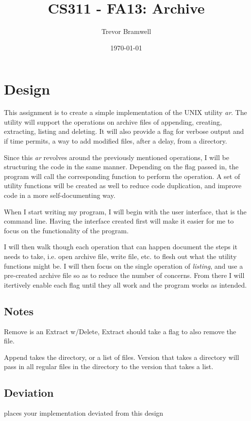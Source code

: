 \documentclass[letterpaper,10pt]{article}
\title{CS311 - FA13: Archive}
\date{\today}
\author{Trevor Bramwell}
\begin{document}
\maketitle

\section{Design}
    This assignment is to create a simple implementation of the UNIX
    utility \emph{ar}. The utility will support the operations on archive files
    of appending, creating, extracting, listing and deleting. It will
    also provide a flag for verbose output and if time permits, a way to
    add modified files, after a delay, from a directory.

    Since this \emph{ar} revolves around the previously mentioned
    operations, I will be structuring the code in the same manner.
    Depending on the flag passed in, the program will call the
    corresponding function to perform the operation. A set of utility
    functions will be created as well to reduce code duplication, and
    improve code in a more self-documenting way.

    When I start writing my program, I will begin with the user
    interface, that is the command line. Having the interface created
    first will make it easier for me to focus on the functionality of
    the program.

    I will then walk though each operation that can happen document the
    steps it needs to take, i.e. open archive file, write file, etc. to
    flesh out what the utility functions might be. I will then focus on
    the single operation of \emph{listing}, and use a pre-created
    archive file so as to reduce the number of concerns. From there I
    will itertively enable each flag until they all work and the program
    works as intended.

\subsection{Notes}
    Remove is an Extract w/Delete, Extract should take a flag to also remove
    the file.

    Append takes the directory, or a list of files. Version that takes a
    directory will pass in all regular files in the directory to the version
    that takes a list.
        
\subsection{Deviation}
    places your implementation deviated from this design
\end{document}
